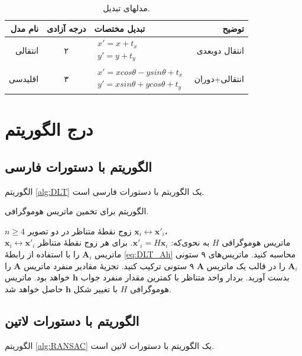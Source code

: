 \begin{table}[ht]
\caption{مدلهای تبدیل.}
\label{tab:MotionModels}
\centering
\onehalfspacing
\begin{tabular}{|r|c|l|r|}
\hline نام مدل & درجه آزادی & تبدیل مختصات & توضیح \\ 
\hline انتقالی & ۲ & $\begin{aligned} x'=x+t_x \\ y'=y+t_y \end{aligned}$  &  انتقال دوبعدی\\ 
\hline اقلیدسی & ۳ & $\begin{aligned} x'=xcos\theta - ysin\theta+t_x \\ y'=xsin\theta+ycos\theta+t_y \end{aligned}$  &  انتقالی+دوران \\ 
\hline 
\end{tabular} 
\end{table}




\section{درج الگوریتم}
\subsection{الگوریتم با دستورات فارسی}
 الگوریتم 
 \eqref{alg:DLT} 
 یک الگوریتم با دستورات فارسی است.
\begin{algorithm}[t]
\onehalfspacing
\caption{الگوریتم  برای تخمین ماتریس هوموگرافی.} \label{alg:DLT}
\begin{algorithmic}[1]
\REQUIRE $n\geq4$ زوج نقطهٔ متناظر در دو تصویر 
${\mathbf{x}_i\leftrightarrow\mathbf{x}'_i}$،\\
\ENSURE ماتریس هوموگرافی $H$ به نحوی‌که: 
$\mathbf{x}'_i = H \mathbf{x}_i$.
  \STATE برای هر زوج نقطهٔ متناظر
$\mathbf{x}_i\leftrightarrow\mathbf{x}'_i$ 
ماتریس $\mathbf{A}_i$ را با استفاده از رابطهٔ \ref{eq:DLT_Ah} محاسبه کنید.
  \STATE ماتریس‌های ۹ ستونی  $\mathbf{A}_i$ را در قالب یک ماتریس $\mathbf{A}$ ۹ ستونی ترکیب کنید. 
  \STATE تجزیهٔ مقادیر منفرد   ماتریس $\mathbf{A}$ را بدست آورید. بردار واحد متناظر با کمترین مقدار منفرد جواب $\mathbf{h}$ خواهد بود.
  \STATE  ماتریس هوموگرافی $H$ با تغییر شکل $\mathbf{h}$ حاصل خواهد شد.
\end{algorithmic}
\end{algorithm}

\subsection{الگوریتم با دستورات لاتین}
الگوریتم
 \ref{alg:RANSAC}
  یک الگوریتم با دستورات لاتین است.

